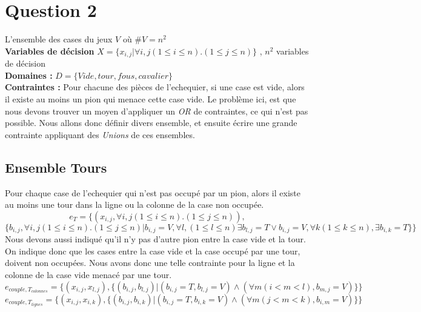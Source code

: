 \documentclass[a4paper,10pt]{article}
\begin{document}
\section{Question 2}
L'ensemble des cases du jeux $V$ où $ \#V = n^2$ \\
\textbf {Variables de décision} $ X = \{x_{i,j} | \forall i,j (1 \leq i \leq n).(1 \leq j \leq n)\}$ , $n^2$ variables de décision \\
\textbf{Domaines : }
$ D = \{Vide, tour, fous, cavalier \} $\\
\textbf{Contraintes : } Pour chacune des pièces de l'echequier, si une case est vide, alors il existe au moins un pion qui menace cette case vide.  Le problème ici, est que nous devons trouver un moyen d'appliquer un \emph{OR} de contraintes, ce qui n'est pas possible.  Nous allons donc définir divers ensemble, et ensuite écrire une grande contrainte appliquant des \emph{Unions} de ces ensembles.

	\subsection{Ensemble Tours}
		Pour chaque case de l'echequier qui n'est pas occupé par un pion, alors il existe au moins une tour dans la ligne ou la colonne de la case non occupée.
		$$ e_T = \{(x_{i,j}, \forall i,j (1 \leq i \leq n).(1 \leq j \leq n)),$$ $$\{b_{i,j}, \forall i,j (1 \leq i \leq n).(1 \leq j \leq n)|b_{i,j} = V, \forall l, (1 \leq l \leq n) \exists b_{l,j} = T \lor b_{i,j} = V, \forall k (1 \leq k \leq n), \exists b_{i,k} = T\}\}  $$
			Nous devons aussi indiqué qu'il n'y pas d'autre pion entre la case vide et la tour.  On indique donc que les cases entre la case vide et la case occupé par une tour, doivent non occupées. Nous avons donc une telle contrainte pour la ligne et la colonne de la case vide menacé par une tour.
		$$ e_{couple,T_{colonnes}} = \{(x_{i,j}, x_{l,j}), \{(b_{i,j}, b_{l,j})|(b_{i,j} = T, b_{l,j} = V) \land ( \forall m (i < m < l), b_{m,j} = V) \}\}$$
		$$ e_{couple,T_{lignes}} = \{(x_{i,j}, x_{i,k}), \{(b_{i,j}, b_{i,k})|(b_{i,j} = T, b_{i,k} = V) \land ( \forall m (j < m < k), b_{i,m} = V) \}\}$$
\end{document}
